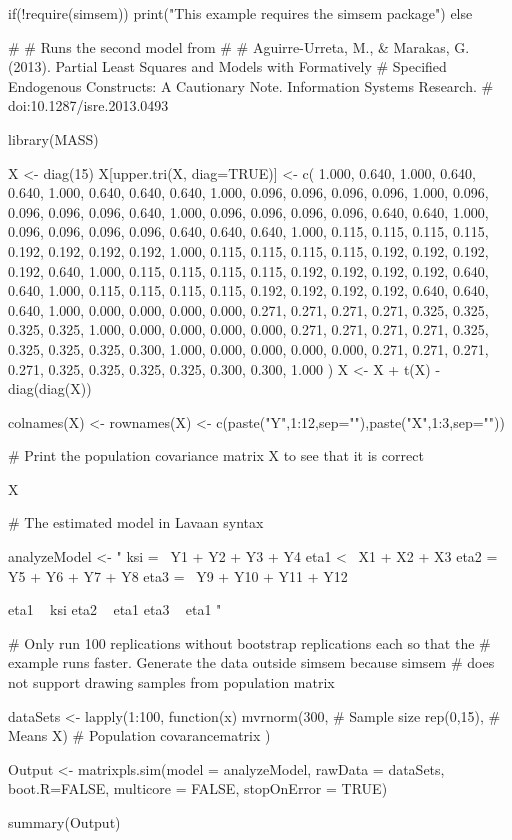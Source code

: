\documentclass[a4paper]{book}
\begin{document}
\begin{Examples}
\begin{ExampleCode}
if(!require(simsem)){
    print("This example requires the simsem package")
} else{

#
# Runs the second model from
#
# Aguirre-Urreta, M., & Marakas, G. (2013). Partial Least Squares and Models with Formatively 
# Specified Endogenous Constructs: A Cautionary Note. Information Systems Research. 
# doi:10.1287/isre.2013.0493

library(MASS)

X <- diag(15) 
X[upper.tri(X, diag=TRUE)] <- c(
  1.000,
  0.640, 1.000,
  0.640, 0.640, 1.000,
  0.640, 0.640, 0.640, 1.000,
  0.096, 0.096, 0.096, 0.096, 1.000,
  0.096, 0.096, 0.096, 0.096, 0.640, 1.000,
  0.096, 0.096, 0.096, 0.096, 0.640, 0.640, 1.000,
  0.096, 0.096, 0.096, 0.096, 0.640, 0.640, 0.640, 1.000,
  0.115, 0.115, 0.115, 0.115, 0.192, 0.192, 0.192, 0.192, 1.000,
  0.115, 0.115, 0.115, 0.115, 0.192, 0.192, 0.192, 0.192, 0.640, 1.000,
  0.115, 0.115, 0.115, 0.115, 0.192, 0.192, 0.192, 0.192, 0.640, 0.640,
  1.000,
  0.115, 0.115, 0.115, 0.115, 0.192, 0.192, 0.192, 0.192, 0.640, 0.640,
  0.640, 1.000,
  0.000, 0.000, 0.000, 0.000, 0.271, 0.271, 0.271, 0.271, 0.325, 0.325,
  0.325, 0.325, 1.000,
  0.000, 0.000, 0.000, 0.000, 0.271, 0.271, 0.271, 0.271, 0.325, 0.325,
  0.325, 0.325, 0.300, 1.000,
  0.000, 0.000, 0.000, 0.000, 0.271, 0.271, 0.271, 0.271, 0.325, 0.325,
  0.325, 0.325, 0.300, 0.300, 1.000
)
X <- X + t(X) - diag(diag(X)) 

colnames(X) <- rownames(X) <- c(paste("Y",1:12,sep=""),paste("X",1:3,sep=""))

# Print the population covariance matrix X to see that it is correct

X

# The estimated model in Lavaan syntax

analyzeModel <- "
ksi =~ Y1 + Y2 + Y3 + Y4
eta1 <~ X1 + X2 + X3
eta2 =~ Y5 + Y6 + Y7 + Y8
eta3 =~ Y9 + Y10 + Y11 + Y12

eta1 ~ ksi
eta2 ~ eta1
eta3 ~ eta1
"

# Only run 100 replications without bootstrap replications each so that the 
# example runs faster. Generate the data outside simsem because simsem
# does not support drawing samples from population matrix

dataSets <- lapply(1:100, function(x){
  mvrnorm(300,                 # Sample size
          rep(0,15),           # Means
          X)                   # Population covarancematrix
})

Output <- matrixpls.sim(model = analyzeModel, rawData = dataSets, boot.R=FALSE,
                        multicore = FALSE, stopOnError = TRUE)

summary(Output)


}
\end{ExampleCode}
\end{Examples}
\end{document}
